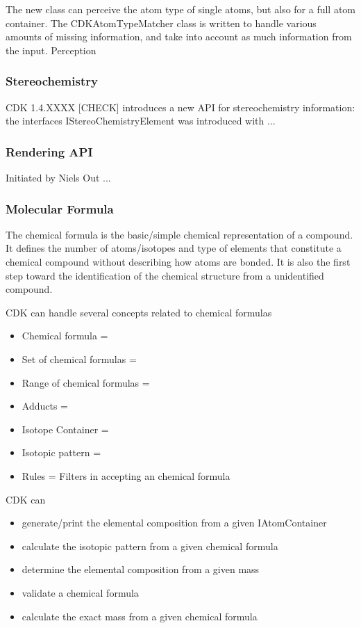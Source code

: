 \documentclass[10pt]{bmc_article}
\newenvironment{bmcformat}{\begin{raggedright}\baselineskip20pt\sloppy\setboolean{publ}{false}}{\end{raggedright}\baselineskip20pt\sloppy}
\begin{document}
\begin{bmcformat}
  The new class can perceive the atom type of single atoms, but also for a full atom container.
  The CDKAtomTypeMatcher class is written to handle various amounts of missing information,
  and take into account as much information from the input. Perception 

  \subsubsection*{Stereochemistry}
  
  CDK 1.4.XXXX [CHECK] introduces a new API for stereochemistry information: the interfaces
  IStereoChemistryElement was introduced with ...

  \subsubsection*{Rendering API}
  
  Initiated by Niels Out ...
  
  \subsubsection*{Molecular Formula}

The chemical formula is the basic/simple chemical representation of a compound. It defines the number of atoms/isotopes and type of elements that constitute a chemical compound without describing how atoms are bonded.
It is also the first step toward the identification of the chemical structure from a unidentified compound.

CDK can handle several concepts related to chemical formulas
\begin{itemize}
\item Chemical formula =
\item Set of chemical formulas =
\item Range of chemical formulas =
\item Adducts =
\item Isotope Container =
\item Isotopic pattern = 
\item Rules = Filters in accepting an chemical formula
\end{itemize}

CDK can
\begin{itemize}
\item generate/print the elemental composition from a given IAtomContainer
\item calculate the isotopic pattern from a given chemical formula
\item determine the elemental composition from a given mass
\item validate a chemical formula
\item calculate the exact mass from a given chemical formula
\end{itemize}


\end{bmcformat}
\end{document}
